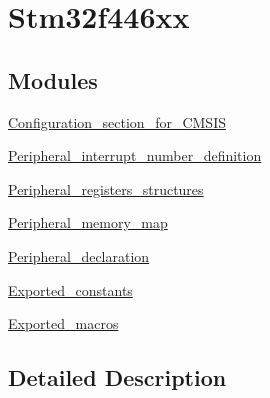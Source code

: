 \hypertarget{group__stm32f446xx}{}\section{Stm32f446xx}
\label{group__stm32f446xx}
\subsection*{Modules}
\begin{DoxyCompactItemize}
\item 
\mbox{\hyperlink{group___configuration__section__for___c_m_s_i_s}{Configuration\+\_\+section\+\_\+for\+\_\+\+C\+M\+S\+IS}}
\item 
\mbox{\hyperlink{group___peripheral__interrupt__number__definition}{Peripheral\+\_\+interrupt\+\_\+number\+\_\+definition}}
\item 
\mbox{\hyperlink{group___peripheral__registers__structures}{Peripheral\+\_\+registers\+\_\+structures}}
\item 
\mbox{\hyperlink{group___peripheral__memory__map}{Peripheral\+\_\+memory\+\_\+map}}
\item 
\mbox{\hyperlink{group___peripheral__declaration}{Peripheral\+\_\+declaration}}
\item 
\mbox{\hyperlink{group___exported__constants}{Exported\+\_\+constants}}
\item 
\mbox{\hyperlink{group___exported__macros}{Exported\+\_\+macros}}
\end{DoxyCompactItemize}


\subsection{Detailed Description}
